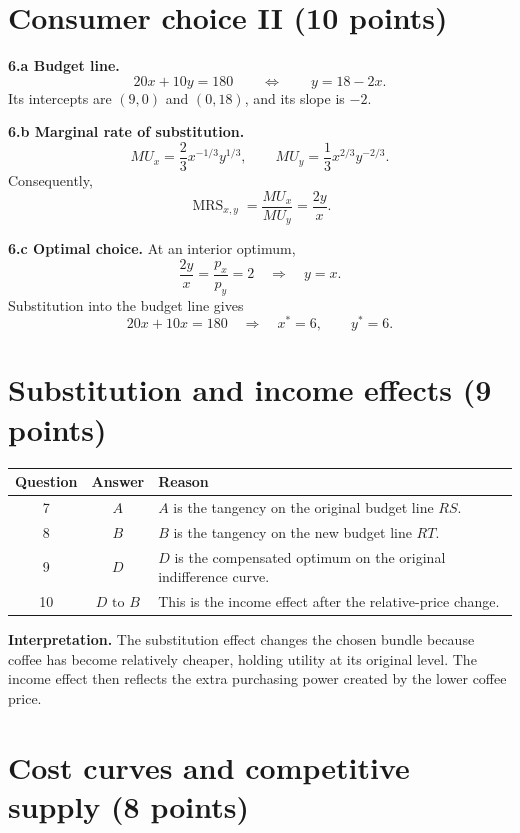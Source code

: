 \documentclass[11pt,a4paper]{article}
\newcommand{\MRS}{\operatorname{MRS}}
\begin{document}
\section{Consumer choice II \hfill (10 points)}

\textbf{6.a Budget line.}
\[
20x+10y=180
\qquad\Longleftrightarrow\qquad
\boxed{y=18-2x}.
\]
Its intercepts are \((9,0)\) and \((0,18)\), and its slope is \(-2\).

\textbf{6.b Marginal rate of substitution.}
\[
MU_x=\frac23x^{-1/3}y^{1/3},
\qquad
MU_y=\frac13x^{2/3}y^{-2/3}.
\]
Consequently,
\[
\MRS_{x,y}=\frac{MU_x}{MU_y}
=\boxed{\frac{2y}{x}}.
\]

\textbf{6.c Optimal choice.} At an interior optimum,
\[
\frac{2y}{x}=\frac{p_x}{p_y}=2
\quad\Longrightarrow\quad y=x.
\]
Substitution into the budget line gives
\[
20x+10x=180
\quad\Longrightarrow\quad
\boxed{x^*=6,\qquad y^*=6.}
\]

\section{Substitution and income effects \hfill (9 points)}

\begin{center}
\begin{tabular}{c|c|l}
Question & Answer & Reason \\ \hline
7 & \(\boxed{A}\) & \(A\) is the tangency on the original budget line \(RS\).\\
8 & \(\boxed{B}\) & \(B\) is the tangency on the new budget line \(RT\).\\
9 & \(\boxed{D}\) & \(D\) is the compensated optimum on the original indifference curve.\\
10 & \(\boxed{D\text{ to }B}\) & This is the income effect after the relative-price change.
\end{tabular}
\end{center}

\begin{tipbox}
\textbf{Interpretation.} The substitution effect changes the chosen bundle
because coffee has become relatively cheaper, holding utility at its original
level. The income effect then reflects the extra purchasing power created by
the lower coffee price.
\end{tipbox}

\section{Cost curves and competitive supply \hfill (8 points)}
\end{document}
